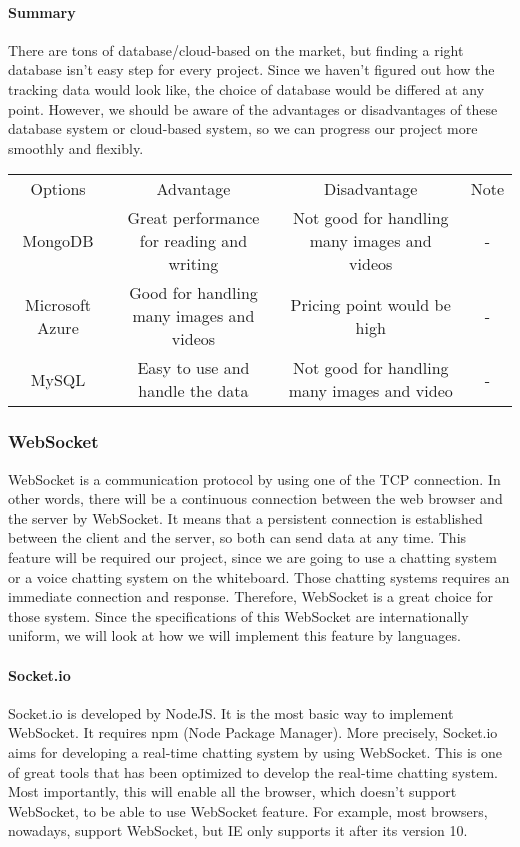 \documentclass[10pt]{article}
\begin{document}
            \paragraph{Summary}
                There are tons of database/cloud-based on the market, but finding a right database isn’t easy step for every project. Since we haven’t figured out how the tracking data would look like, the choice of database would be differed at any point. However, we should be aware of the advantages or disadvantages of these database system or cloud-based system, so we can progress our project more smoothly and flexibly.

                \begin{center}
                \begin{tabular}{ |c|c|c|c| } \hline
                     Options & Advantage & Disadvantage & Note \\
                     MongoDB & Great performance for reading and writing & Not good for handling many images and videos & - \\
                     Microsoft Azure & Good for handling many images and videos & Pricing point would be high & -\\
                     MySQL & Easy to use and handle the data & Not good for handling many images and video & -\\
                     \hline
                \end{tabular}
                \end{center}

        \subsubsection{WebSocket}
            WebSocket is a communication protocol by using one of the TCP connection. In other words, there will be a continuous connection between the web browser and the server by WebSocket. It means that a persistent connection is established between the client and the server, so both can send data at any time. This feature will be required our project, since we are going to use a chatting system or a voice chatting system on the whiteboard. Those chatting systems requires an immediate connection and response. Therefore, WebSocket is a great choice for those system. Since the specifications of this WebSocket are internationally uniform, we will look at how we will implement this feature by languages.

            \paragraph{Socket.io}
                Socket.io is developed by NodeJS. It is the most basic way to implement WebSocket. It requires npm (Node Package Manager). More precisely, Socket.io aims for developing a real-time chatting system by using WebSocket. This is one of great tools that has been optimized to develop the real-time chatting system. Most importantly, this will enable all the browser, which doesn’t support WebSocket, to be able to use WebSocket feature. For example, most browsers, nowadays, support WebSocket, but IE only supports it after its version 10. \cite{si}
\end{document}

